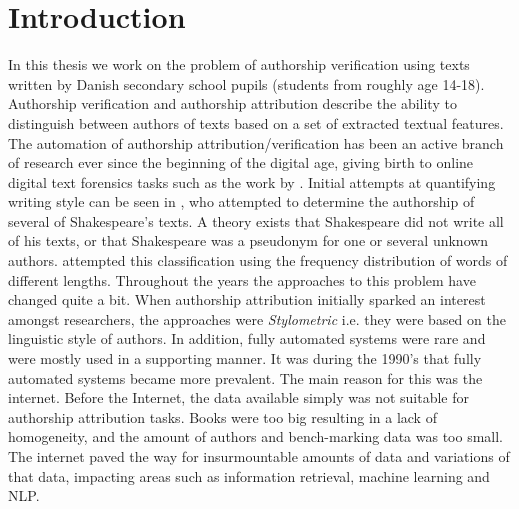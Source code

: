 %

\section{Introduction} \label{sec:introduction}


In this thesis we work on the problem of authorship verification using texts
written by Danish secondary school pupils (students from roughly age 14-18).
Authorship verification and authorship attribution describe the ability to
distinguish between authors of texts based on a set of extracted textual
features. The automation of authorship attribution/verification has been
an active branch of research ever since the beginning of the digital age,
giving birth to online digital text forensics tasks such as the work by
\citet{pan:2015}. Initial attempts at quantifying writing style can be seen in
\citet{Mendenhall237}, who attempted to determine the authorship of several
of Shakespeare's texts. A theory exists that Shakespeare did not write all
of his texts, or that Shakespeare was a pseudonym for one or several unknown
authors. \citet{Mendenhall237} attempted this classification using the
frequency distribution of words of different lengths. Throughout the years the
approaches to this problem have changed quite a bit. When authorship attribution
initially sparked an interest amongst researchers, the approaches were
\textit{Stylometric} i.e. they were based on the linguistic style of authors. In
addition, fully automated systems were rare and were mostly used in a supporting
manner. It was during the 1990's that fully automated systems became more
prevalent. The main reason for this was the internet. Before the Internet, the
data available simply was not suitable for authorship attribution tasks. Books
were too big resulting in a lack of homogeneity, and the amount of authors and
bench-marking data was too small. The internet paved the way for insurmountable
amounts of data and variations of that data, impacting areas such as information
retrieval, machine learning and \gls{NLP}.\cite{stamatos2009}

